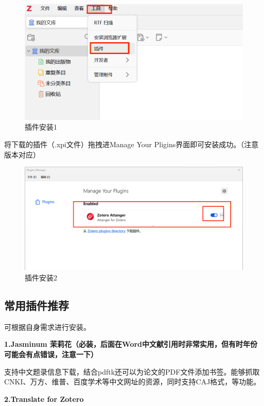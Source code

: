 \documentclass[]{ctexbook}
\theoremstyle{definition}
\theoremstyle{definition}
\theoremstyle{definition}
\theoremstyle{definition}
\theoremstyle{remark}
\begin{document}
\begin{figure}

{\centering \includegraphics[width=0.7\linewidth]{img/zotero/zotero_plugins_install_1} 

}

\caption{插件安装1}\label{fig:zotero-plugins-install-1}
\end{figure}

将下载的插件（.xpi文件）拖拽进Manage Your Pligins界面即可安装成功。（注意版本对应）

\begin{figure}

{\centering \includegraphics[width=0.7\linewidth]{img/zotero/zotero_plugins_install_2} 

}

\caption{插件安装2}\label{fig:zotero-plugins-install-2}
\end{figure}

\subsection{常用插件推荐}\label{ux5e38ux7528ux63d2ux4ef6ux63a8ux8350}

可根据自身需求进行安装。

\textbf{1.Jasminum 茉莉花（必装，后面在Word中文献引用时非常实用，但有时年份可能会有点错误，注意一下）}

支持中文题录信息下载，结合pdftk还可以为论文的PDF文件添加书签。能够抓取CNKI、万方、维普、百度学术等中文网址的资源，同时支持CAJ格式，等功能。

\textbf{2.Translate for Zotero}
\end{document}
